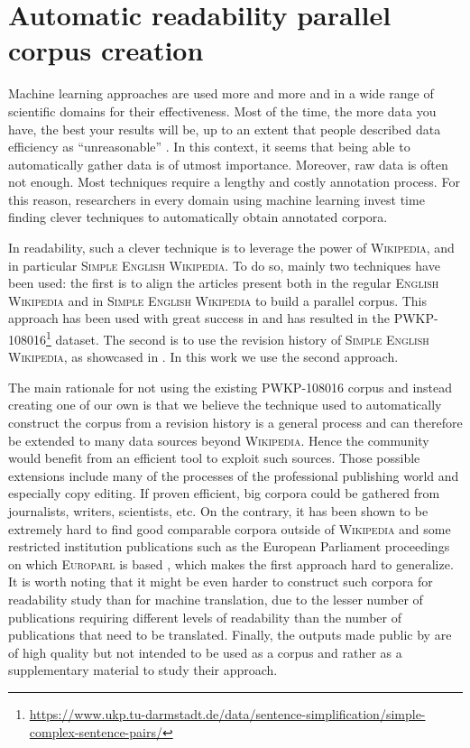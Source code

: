 \documentclass[a4paper, 11pt, onepage]{scrreprt}
\newcommand\wiki{\textsc{Wikipedia}}
\newcommand\ew{\textsc{English Wikipedia}}
\newcommand\sew{\textsc{Simple English Wikipedia}}
\begin{document}
\section{Automatic readability parallel corpus creation}
\label{sec:corpus}

Machine learning approaches are used more and more and in a wide range
of scientific domains for their effectiveness. Most of the time, the
more data you have, the best your results will be, up to an extent
that people described data efficiency as “unreasonable”
\cite{halevy2009unreasonable}. In this context, it seems that being
able to automatically gather data is of utmost importance. Moreover,
raw data is often not enough. Most techniques require a lengthy and
costly annotation process. For this reason, researchers in every
domain using machine learning invest time finding clever techniques to
automatically obtain annotated corpora.

In readability, such a clever technique is to leverage the power of
\wiki, and in particular \sew. To do so, mainly two techniques have
been used: the first is to align the articles present both in the
regular \ew{} and in \sew{} to build a parallel corpus. This approach
has been used with great success in \cite{zhu2010monolingual} and has
resulted in the
\textsc{PWKP-108016}\footnote{\url{https://www.ukp.tu-darmstadt.de/data/sentence-simplification/simple-complex-sentence-pairs/}}
dataset. The second is to use the revision history of \sew, as
showcased in \cite{yatskar2010sake}. In this work we use the second
approach.

The main rationale for not using the existing \textsc{PWKP-108016}
corpus and instead creating one of our own is that we believe the
technique used to automatically construct the corpus from a revision
history is a general process and can therefore be extended to many
data sources beyond \wiki. Hence the community would benefit from an
efficient tool to exploit such sources. Those possible extensions
include many of the processes of the professional publishing world and
especially copy editing. If proven efficient, big corpora could be
gathered from journalists, writers, scientists, etc. On the contrary,
it has been shown to be extremely hard to find good comparable corpora
outside of \wiki{} and some restricted institution publications such
as the European Parliament proceedings on which \textsc{Europarl} is
based \cite{koehn2005europarl}, which makes the first approach hard to
generalize. It is worth noting that it might be even harder to
construct such corpora for readability study than for machine
translation, due to the lesser number of publications requiring
different levels of readability than the number of publications that
need to be translated. Finally, the outputs made public by
\cite{yatskar2010sake} are of high quality but not intended to be used
as a corpus and rather as a supplementary material to study their
approach.
\end{document}
